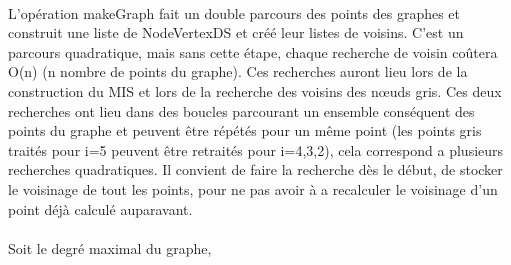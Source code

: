 \paragraph{}
L'opération makeGraph fait un double parcours des points des graphes et construit une liste de NodeVertexDS et créé leur listes de voisins.
C'est un parcours quadratique, mais sans cette étape, chaque recherche de voisin coûtera O(n) (n nombre de points du graphe). Ces recherches auront lieu lors de la construction du MIS et lors de la recherche des voisins des nœuds gris.
Ces deux recherches ont lieu dans des boucles parcourant un ensemble conséquent des points du graphe et peuvent être répétés pour un même point (les points gris traités pour i=5 peuvent être retraités pour i=4,3,2), cela correspond a plusieurs recherches quadratiques. Il convient de faire la recherche dès le début, de stocker le voisinage de tout les points, pour ne pas avoir à a recalculer le voisinage d'un point déjà calculé auparavant.

\paragraph{}
Soit \delta le degré maximal du graphe, 